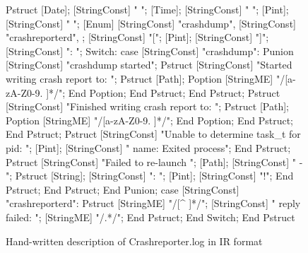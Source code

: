 \begin{figure}
\begin{code}
Pstruct
  [Date];
  [StringConst] " ";
  [Time];
  [StringConst] " ";
  [Pint];
  [StringConst] " ";
  [Enum] {[StringConst] "crashdump", 
          [StringConst] "crashreporterd", };
  [StringConst] "[";
  [Pint];
  [StringConst] "]";
  [StringConst] ": ";
  Switch:
  case [StringConst] "crashdump":
    Punion
      [StringConst] "crashdump started";
      Pstruct
        [StringConst] "Started writing crash 
                       report to: ";
        Pstruct
          [Path];
          Poption
            [StringME] "/[a-zA-Z0-9. ]*/";
          End Poption;
        End Pstruct;
      End Pstruct;
      Pstruct
        [StringConst] "Finished writing crash 
                       report to: ";
        Pstruct
          [Path];
          Poption
            [StringME] "/[a-zA-Z0-9. ]*/";
          End Poption;
        End Pstruct;
      End Pstruct;
      Pstruct
        [StringConst] "Unable to determine 
                       task_t for pid: ";
        [Pint];
        [StringConst] " name: Exited process";
      End Pstruct;
      Pstruct
        [StringConst] "Failed to re-launch ";
        [Path];
        [StringConst] " - ";
        Pstruct
                [String];
                [StringConst] ": ";
                [Pint];
                [StringConst] "!";
        End Pstruct;
      End Pstruct;
    End Punion;
  case [StringConst] "crashreporterd":
    Pstruct
      [StringME] "/[^ ]*/";
      [StringConst] " reply failed: ";
      [StringME] "/.*/";
    End Pstruct;
  End Switch;
End Pstruct
\end{code} 
\caption{Hand-written description of Crashreporter.log in IR format}
\label{fig:crashreporter:ir}
\end{figure}
